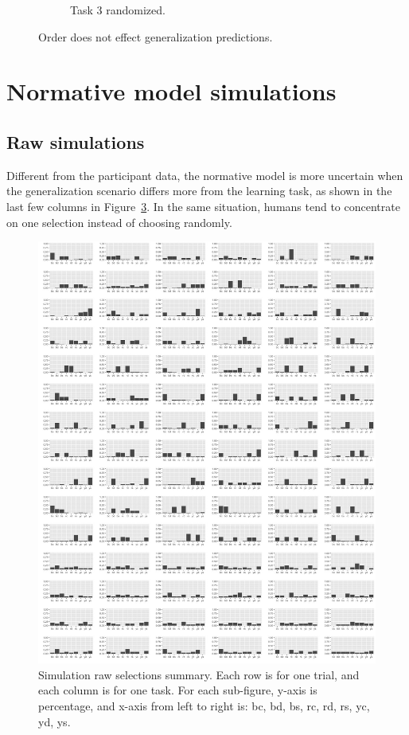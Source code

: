 \documentclass{article}
\begin{document}
\begin{figure}[h!]
\begin{subfigure}[t]{0.45\textwidth}
    \caption{Task 3 randomized.} \label{fig:random}
  \end{subfigure}
  \caption{Order does not effect generalization predictions.}
\end{figure}


\newpage
\section{Normative model simulations}
\subsection{Raw simulations}

Different from the participant data, the normative model is more uncertain when the generalization scenario differs more from the learning task, as shown in the last few columns in Figure~\ref{fig:sim_raw}. In the same situation, humans tend to concentrate on one selection instead of choosing randomly.

\begin{figure}[h!]
  \centering
  \includegraphics[width=.8\linewidth]{sim_trials}
  \caption{Simulation raw selections summary. Each row is for one trial, and each column is for one task. For each sub-figure, y-axis is percentage, and x-axis from left to right is: bc, bd, bs, rc, rd, rs, yc, yd, ys.}
  \label{fig:sim_raw}
\end{figure}
\end{document}
